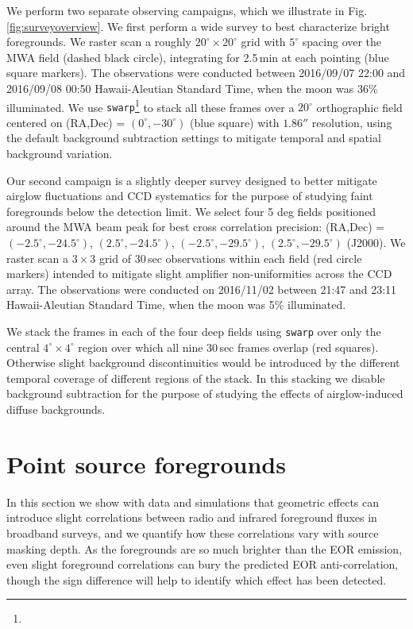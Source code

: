 \documentclass[numberedappendix]{emulateapj}
\providecommand{\DIFadd}[1]{{\protect\color{blue}\uwave{#1}}} %
\providecommand{\DIFaddbegin}{} %
\providecommand{\DIFaddend}{} %
\begin{document}
We perform two separate observing campaigns, which we illustrate in Fig. \ref{fig:surveyoverview}. We first perform a wide survey to best characterize bright foregrounds. We raster scan a roughly $20^\circ\times20^\circ$ grid with $5^\circ$ spacing over the MWA field (dashed black circle), integrating for 2.5\,min at each pointing (blue square markers). The observations were conducted between 2016/09/07 22:00  and 2016/09/08 00:50 Hawaii-Aleutian Standard Time, when the moon was 36\% illuminated. We use {\tt swarp}\footnote{} \citep{swarp} to stack all these frames over a $20^\circ$ orthographic field centered on (RA,Dec) = $(0^\circ,-30^\circ)$ (blue square) with $1.86''$ resolution, using the default background subtraction settings to mitigate temporal and spatial background variation. 


Our second campaign is a slightly deeper survey designed to better mitigate airglow fluctuations and CCD systematics for the purpose of studying faint foregrounds below the detection limit. We select four 5 deg fields positioned around the MWA beam peak for best cross correlation precision: (RA,Dec) = $(-2.5^\circ, -24.5^\circ)$, $(2.5^\circ, -24.5^\circ)$, $(-2.5^\circ, -29.5^\circ)$, $(2.5^\circ, -29.5^\circ)$ (J2000). We raster scan a $3\times3$ grid of 30\,sec observations within each field (red circle markers) intended to mitigate slight amplifier non-uniformities across the CCD array. The observations were conducted on 2016/11/02 between 21:47 and 23:11 Hawaii-Aleutian Standard Time, when the moon was 5\% illuminated. 

We stack the frames in each of the four deep fields using {\tt swarp} over only the central $4^\circ\times 4^\circ$ region over which all nine 30\,sec frames overlap (red squares). Otherwise slight background discontinuities would be introduced by the different temporal coverage of different regions of the stack. In this stacking we disable background subtraction for the purpose of studying the effects of airglow-induced diffuse backgrounds.

\section{Point source foregrounds}
\label{sec:pointsourcefgs}

In this section we show with data and simulations that geometric effects can introduce slight correlations between radio and infrared foreground fluxes in broadband surveys, and we quantify how these correlations vary with source masking depth. As the foregrounds are so much brighter than the EOR emission, even slight foreground correlations can bury the predicted EOR anti-correlation, though the \DIFaddbegin \DIFadd{expected }\DIFaddend sign difference will help to identify which effect has been detected.
\end{document}
